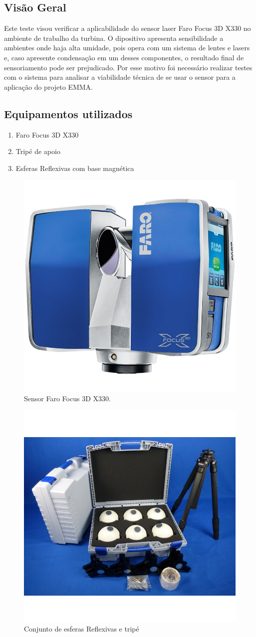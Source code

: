 \subsection{Visão Geral}
Este teste visou verificar a aplicabilidade do sensor laser Faro Focus 3D X330
no ambiente de trabalho da turbina. O dipositivo apresenta sensibilidade a
ambientes onde haja alta umidade, pois opera com um sistema de lentes e lasers
e, caso apresente condensação em um desses componentes, o resultado final de
sensoriamento pode ser prejudicado. Por esse motivo foi necessário realizar
testes com o sistema para analisar a viabilidade técnica de se usar o sensor
para a aplicação do projeto EMMA. 


\subsection{Equipamentos utilizados}

\begin{enumerate}
\item Faro Focus 3D X330 
\item Tripé de apoio
\item Esferas Reflexivas com base magnética
\end{enumerate}

\begin{figure}[h!]
\centering
	\includegraphics[width=0.4\columnwidth]{figs/faro/sensor}
	\caption{Sensor Faro Focus 3D X330.}
	\label{fig::sensor}
\end{figure}

\begin{figure}[h!]
\centering
	\includegraphics[width=0.5\columnwidth]{figs/faro/kit}
	\caption{Conjunto de esferas Reflexivas e tripé}
	\label{fig::kit}
\end{figure}


